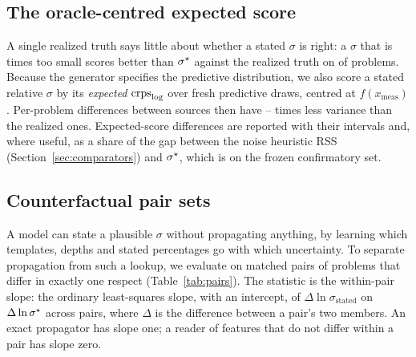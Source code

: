 \subsection{The oracle-centred expected score}
\label{sec:expected}

A single realized truth says little about whether a stated $\sigma$ is right: a $\sigma$ that is 
times too small scores better than $\sigma^{\star}$ against the realized truth on  of problems.
Because the generator specifies the predictive distribution, we also score a stated relative $\sigma$ by its
\emph{expected} $\mathrm{crps}_{\log}$ over  fresh predictive draws, centred at $f(x_{\text{meas}})$.
Per-problem differences between sources then have -- times less variance than
the realized ones.
Expected-score differences are reported with their intervals and, where useful, as a share of the gap between the
noise heuristic RSS (Section~\ref{sec:comparators}) and $\sigma^{\star}$, which is  on the frozen
confirmatory set.

\subsection{Counterfactual pair sets}
\label{sec:pairs}

A model can state a plausible $\sigma$ without propagating anything, by learning which templates, depths and stated
percentages go with which uncertainty.
To separate propagation from such a lookup, we evaluate on matched pairs of problems that differ in exactly one
respect (Table~\ref{tab:pairs}).
The statistic is the within-pair slope: the ordinary least-squares slope, with an intercept, of
$\Delta\ln\sigma_{\text{stated}}$ on $\Delta\ln\sigma^{\star}$ across pairs, where $\Delta$ is the difference between a
pair's two members.
An exact propagator has slope one; a reader of features that do not differ within a pair has slope zero.


